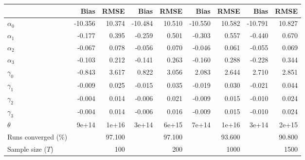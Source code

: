 
\begin{tabular}[t]{lrrrrrrrr}
\toprule
  & Bias & RMSE & Bias & RMSE & Bias & RMSE & Bias & RMSE\\
\midrule
$\alpha_{0}$ & -10.356 & 10.374 & -10.484 & 10.510 & -10.550 & 10.582 & -10.791 & 10.827\\
$\alpha_{1}$ & -0.177 & 0.395 & -0.259 & 0.501 & -0.303 & 0.557 & -0.440 & 0.670\\
$\alpha_{2}$ & -0.067 & 0.078 & -0.056 & 0.070 & -0.046 & 0.061 & -0.055 & 0.069\\
$\alpha_{3}$ & -0.103 & 0.212 & -0.141 & 0.263 & -0.160 & 0.288 & -0.228 & 0.344\\
$\gamma_{0}$ & -0.843 & 3.617 & 0.822 & 3.056 & 2.083 & 2.644 & 2.710 & 2.851\\
$\gamma_{1}$ & -0.009 & 0.025 & -0.015 & 0.035 & -0.019 & 0.030 & -0.021 & 0.044\\
$\gamma_{2}$ & -0.004 & 0.014 & -0.006 & 0.021 & -0.009 & 0.015 & -0.010 & 0.024\\
$\gamma_{3}$ & -0.004 & 0.014 & -0.006 & 0.016 & -0.009 & 0.015 & -0.010 & 0.024\\
$\theta$ & 9e+14 & 1e+16 & 3e+14 & 6e+15 & 7e+14 & 1e+16 & 3e+14 & 2e+15\\
Runs converged (\%) &  & 97.100 &  & 97.100 &  & 93.600 &  & 90.800\\
Sample size ($T$) &  & 100 &  & 200 &  & 1000 &  & 1500\\
\bottomrule
\end{tabular}
